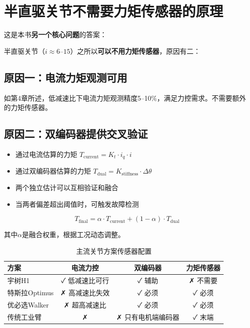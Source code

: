 \section{半直驱关节不需要力矩传感器的原理}

这是本书\textbf{另一个核心问题}的答案：

半直驱关节（$i \approx 6\text{--}15$）之所以\textbf{可以不用力矩传感器}，原因有二：

\subsection{原因一：电流力矩观测可用}

如第4章所述，低减速比下电流力矩观测精度5--10\%，满足力控需求。不需要额外的力矩传感器。

\subsection{原因二：双编码器提供交叉验证}

\begin{itemize}
  \item 通过电流估算的力矩 $T_{\text{current}} = K_t \cdot i_q \cdot i$
  \item 通过双编码器估算的力矩 $T_{\text{dual}} = K_{\text{stiffness}} \cdot \Delta\theta$
  \item 两个独立估计可以互相验证和融合
  \item 当两者偏差超出阈值时，可触发故障检测
\end{itemize}

\begin{equation}
T_{\text{final}} = \alpha \cdot T_{\text{current}} + (1-\alpha) \cdot T_{\text{dual}}
\end{equation}

其中$\alpha$是融合权重，根据工况动态调整。

\begin{table}[H]
\centering
\begin{tabular}{lccc}
\toprule
\textbf{方案} & \textbf{电流力控} & \textbf{双编码器} & \textbf{力矩传感器} \\
\midrule
宇树H1 & ✓ 低减速比可行 & ✓ 辅助 & ✗ 不需要 \\
特斯拉Optimus & ✗ 高减速比失效 & ✓ 必须 & ✓ 必须 \\
优必选Walker & ✗ 超高减速比 & ✓ 必须 & ✓ 必须 \\
传统工业臂 & ✗ & ✗ 只有电机端编码器 & ✓ 末端 \\
\bottomrule
\end{tabular}
\caption{主流关节方案传感器配置}
\label{tab:sensor_config}
\end{table}

